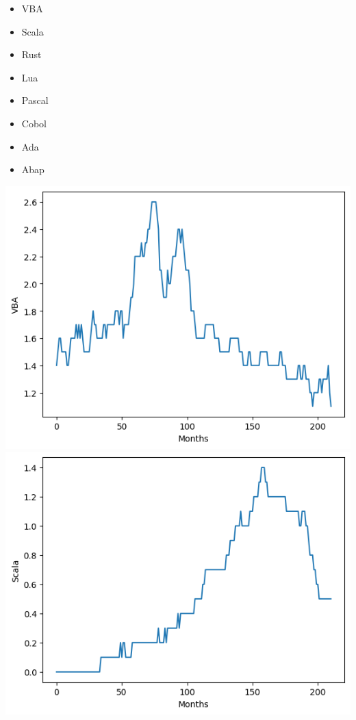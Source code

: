 \documentclass[conference]{IEEEtran}
\begin{document}
\begin{itemize}
\item{VBA}
\item{Scala}
\item{Rust}
\item{Lua}
\item{Pascal}
\item{Cobol}
\item{Ada}
\item{Abap}
\end{itemize}

\includegraphics[scale=0.4]{lineplot/vba.png}
\includegraphics[scale=0.4]{lineplot/scala.png}
\end{document}
